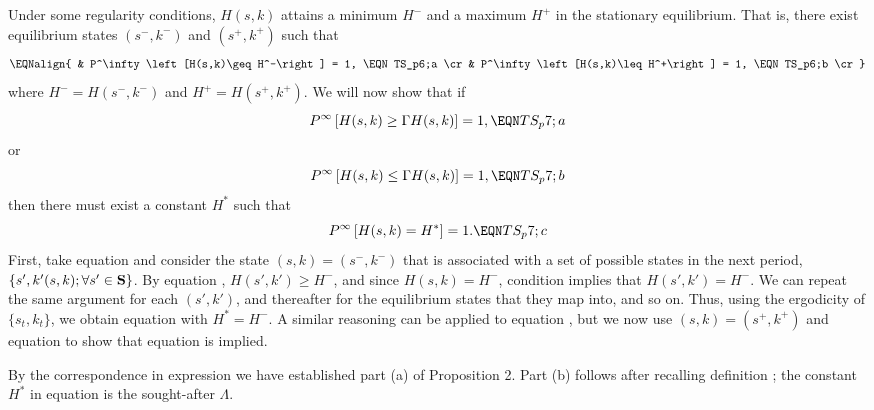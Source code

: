 Under some regularity conditions, $H(s,k)$ attains a minimum $H^-$ and a
maximum $H^+$ in the stationary equilibrium. That is, there exist
equilibrium states $(s^-,k^-)$ and  $(s^+,k^+)$
such that
$$\EQNalign{
& P^\infty\left[H(s,k)\geq H^-\right] = 1,       \EQN TS_p6;a \cr
& P^\infty\left[H(s,k)\leq H^+\right] = 1,       \EQN TS_p6;b \cr}
$$
where
$H^-=H(s^-,k^-)$ and
$H^+=H(s^+,k^+)$.
We will now show that if
$$P^\infty\left[H(s,k)\geq \Gamma H(s,k) \right] = 1,       \EQN TS_p7;a
$$
or
$$P^\infty\left[H(s,k)\leq \Gamma H(s,k) \right] = 1,       \EQN TS_p7;b
$$
then there must exist a constant $H^*$ such that
$$P^\infty\left[H(s,k) = H^* \right] = 1.                   \EQN TS_p7;c
$$
First, take equation  and consider the state
$(s,k)=(s^-,k^-)$ that is associated with a set of
possible states in the next period, $\{s',k'(s,k); \forall s'\in {\bf S}\}$.
By equation , $H(s',k')\geq H^-$, and since $H(s,k)=H^-$,
condition  implies that $H(s',k')=H^-$.
We can repeat the same argument for each
$(s',k')$, and thereafter for the equilibrium states that they
map into, and so on.
Thus, using the ergodicity of $\{s_t, k_t\}$, we obtain equation 
with $H^*=H^-$.
A similar reasoning can be applied to equation , but we now
use $(s,k)=(s^+,k^+)$ and equation  to show that equation 
is implied.

By the correspondence in expression  we have established part (a) of
Proposition 2. Part (b) follows after recalling
definition ; the constant $H^*$ in equation
  is the
sought-after $\Lambda$.
 
